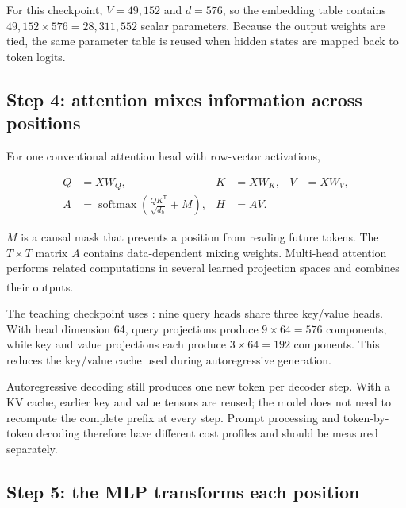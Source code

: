 For this checkpoint, $V=49{,}152$ and $d=576$, so the embedding table contains
$49{,}152\times576=28{,}311{,}552$ scalar parameters.
Because the output weights are tied, the same parameter table is reused when
hidden states are mapped back to token logits.

\subsection{Step 4: attention mixes information across positions}

For one conventional attention head with row-vector activations,

\begin{align}
    Q &= XW_Q, & K &= XW_K, & V &= XW_V,
    \label{eq:qkv-projections}\\
    A &= \operatorname{softmax}\!\left(
        \frac{QK^{\mathsf T}}{\sqrt{d_h}} + M\right),
    & H &= AV.
    \label{eq:scaled-dot-product-attention}
\end{align}

$M$ is a causal mask that prevents a position from reading future tokens.
The $T\times T$ matrix $A$ contains data-dependent mixing weights.
Multi-head attention performs related computations in several learned
projection spaces and combines their
outputs.\textsuperscript{\cite{vaswaniAttentionAllYou2023}}

The teaching checkpoint uses : nine query
heads share three key/value heads.
With head dimension 64, query projections produce $9\times64=576$ components,
while key and value projections each produce $3\times64=192$ components.
This reduces the key/value cache used during autoregressive generation.

\begin{engineernote}
Autoregressive decoding still produces one new token per decoder step.
With a KV cache, earlier key and value tensors are reused; the model does not
need to recompute the complete prefix at every step.
Prompt processing and token-by-token decoding therefore have different cost
profiles and should be measured separately.
\end{engineernote}

\subsection{Step 5: the MLP transforms each position}

